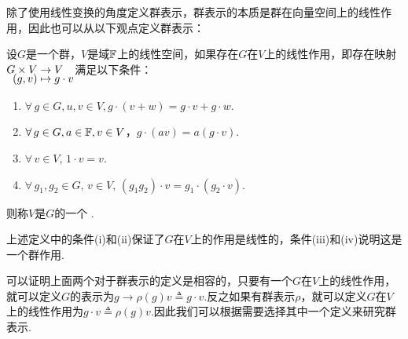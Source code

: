 除了使用线性变换的角度定义群表示，群表示的本质是群在向量空间上的线性作用，因此也可以从以下观点定义群表示：
\begin{definition}[群作用观点的群表示]
    设$G$是一个群，$V$是域$\mathbb{F}$上的线性空间，如果存在$G$在$V$上的线性作用，即存在映射$\setjot[-4]\begin{aligned}[t]
    G\times V &\to V \\
    (g,v) &\mapsto g\cdot v
    \end{aligned}$满足以下条件：
    \begin{enumerate}[label=(\roman*)]
        \item $\forall\, g\in G,u,v\in V,g\cdot(v+w)=g\cdot v+g\cdot w$.
        \item $\forall\, g\in G,a\in\mathbb{F},v\in V$，$g\cdot(av)=a(g\cdot v)$.
        \item $\forall\, v\in V,\, 1\cdot v=v$.
        \item $\forall\, g_1,g_2\in G,\, v\in V,\, (g_1g_2)\cdot v=g_1\cdot(g_2\cdot v)$.
    \end{enumerate}
    则称$V$是$G$的一个 .
\end{definition}
上述定义中的条件(i)和(ii)保证了$G$在$V$上的作用是线性的，条件(iii)和(iv)说明这是一个群作用.\par
可以证明上面两个对于群表示的定义是相容的，只要有一个$G$在$V$上的线性作用，就可以定义$G$的表示为$g\to\rho(g)v\triangleq g\cdot v$.反之如果有群表示$\rho$，就可以定义$G$在$V$上的线性作用为$g\cdot v\triangleq \rho(g)v$.因此我们可以根据需要选择其中一个定义来研究群表示.

